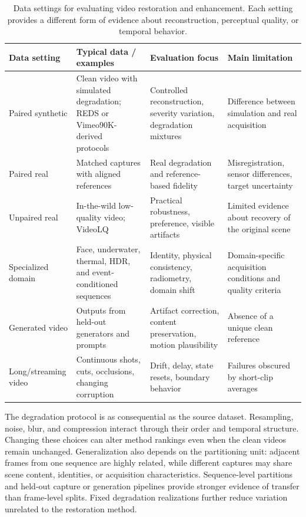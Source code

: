 \begin{table}[t]
\caption{Data settings for evaluating video restoration and enhancement. Each setting provides a different form of evidence about reconstruction, perceptual quality, or temporal behavior.}
\label{tab:data}\centering\footnotesize
\begin{tabularx}{\textwidth}{@{}p{}YYY@{}}\toprule
Data setting & Typical data / examples & Evaluation focus & Main limitation \\\midrule
Paired synthetic & Clean video with simulated degradation; REDS or Vimeo90K-derived protocols~\cite{reds,vimeo90k} & Controlled reconstruction, severity variation, degradation mixtures & Difference between simulation and real acquisition \\
Paired real & Matched captures with aligned references & Real degradation and reference-based fidelity & Misregistration, sensor differences, target uncertainty \\
Unpaired real & In-the-wild low-quality video; VideoLQ~\cite{realbasicvsr} & Practical robustness, preference, visible artifacts & Limited evidence about recovery of the original scene \\
Specialized domain & Face, underwater, thermal, HDR, and event-conditioned sequences & Identity, physical consistency, radiometry, domain shift & Domain-specific acquisition conditions and quality criteria \\
Generated video & Outputs from held-out generators and prompts & Artifact correction, content preservation, motion plausibility & Absence of a unique clean reference \\
Long/streaming video & Continuous shots, cuts, occlusions, changing corruption & Drift, delay, state resets, boundary behavior & Failures obscured by short-clip averages \\\bottomrule
\end{tabularx}
\end{table}

The degradation protocol is as consequential as the source dataset. Resampling, noise, blur, and compression interact through their order and temporal structure. Changing these choices can alter method rankings even when the clean videos remain unchanged. Generalization also depends on the partitioning unit: adjacent frames from one sequence are highly related, while different captures may share scene content, identities, or acquisition characteristics. Sequence-level partitions and held-out capture or generation pipelines provide stronger evidence of transfer than frame-level splits. Fixed degradation realizations further reduce variation unrelated to the restoration method.

